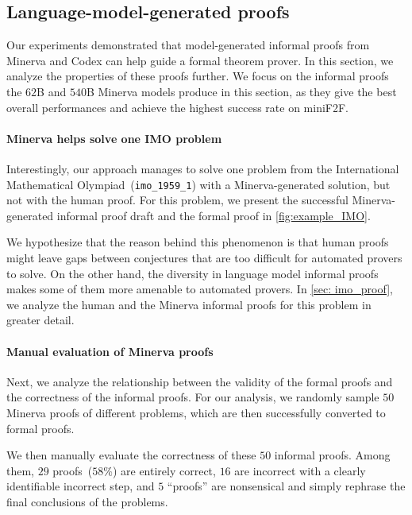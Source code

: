 \subsection{Language-model-generated proofs}

Our experiments demonstrated that model-generated informal proofs from Minerva and Codex can help guide a formal theorem prover. In this section, we analyze the properties of these proofs further. We focus on the informal proofs the $62$B and $540$B Minerva models produce in this section, as they give the best overall performances and achieve the highest success rate on miniF2F.

\paragraph{Minerva helps solve one IMO problem} Interestingly, our approach manages to solve one problem from the International Mathematical Olympiad~(\texttt{imo\_1959\_1}) with a Minerva-generated solution, but not with the human proof. For this problem, we present the successful Minerva-generated informal proof draft and the formal proof in \autoref{fig:example_IMO}.

We hypothesize that the reason behind this phenomenon is that human proofs might leave gaps between conjectures that are too difficult for automated provers to solve. On the other hand, the diversity in language model informal proofs makes some of them more amenable to automated provers. In \autoref{sec: imo_proof}, we analyze the human and the Minerva informal proofs for this problem in greater detail.

\paragraph{Manual evaluation of Minerva proofs} Next, we analyze the relationship between the validity of the formal proofs and the correctness of the informal proofs. For our analysis, we randomly sample $50$ Minerva proofs of different problems, which are then successfully converted to formal proofs.

We then manually evaluate the correctness of these $50$ informal proofs. Among them, $29$ proofs~($58\%$) are entirely correct, $16$ are incorrect with a clearly identifiable incorrect step, and $5$ ``proofs'' are nonsensical and simply rephrase the final conclusions of the problems.

